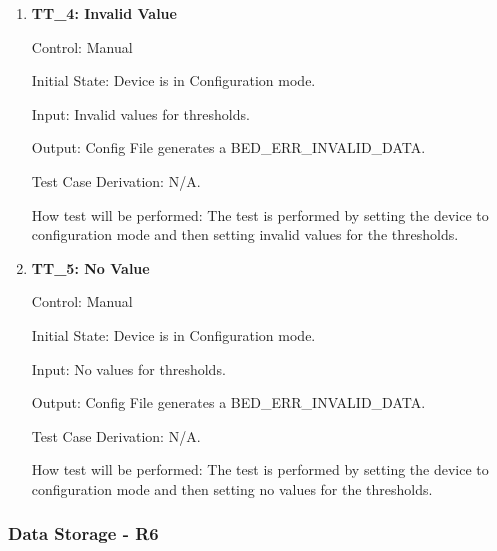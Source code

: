 \documentclass[12pt, titlepage]{article}
\begin{document}
\begin{enumerate}
	\item{\textbf{TT\_4: Invalid Value} \\}
	
		Control: Manual 
							
		Initial State: Device is in Configuration mode.
							
		Input: Invalid values for thresholds.
		
		Output: Config File generates a BED\_ERR\_INVALID\_DATA.
		
		Test Case Derivation: N/A.
							
		How test will be performed: The test is performed by setting the device to configuration mode and then setting invalid values for the thresholds.

	\item{\textbf{TT\_5: No Value} \\}
	
		Control: Manual 
							
		Initial State: Device is in Configuration mode.
							
		Input: No values for thresholds.
		
		Output: Config File generates a BED\_ERR\_INVALID\_DATA.
		
		Test Case Derivation: N/A.
							
		How test will be performed: The test is performed by setting the device to configuration mode and then setting no values for the thresholds.
\end{enumerate}

\subsubsection{Data Storage - \textbf{R6}}
\end{document}
